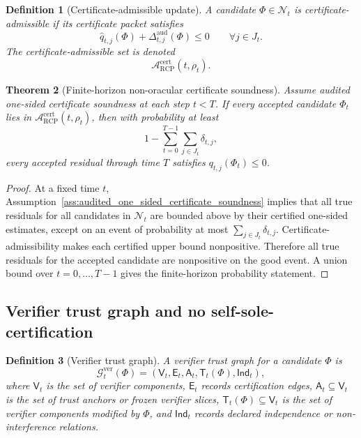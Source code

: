 \documentclass[11pt]{article}
\newtheorem{theorem}{Theorem}[section]
\newtheorem{definition}[theorem]{Definition}
\newcommand{\Acal}{\mathcal{A}}
\newcommand{\Gcal}{\mathcal{G}}
\newcommand{\1}{\mathbf{1}}
\newcommand{\RCP}{\mathrm{RCP}}
\providecommand{\Ncal}{\mathcal{N}}
\providecommand{\ver}{\mathrm{ver}}
\begin{document}
\begin{definition}[Certificate-admissible update]
\label{def:certificate_admissible_update}
A candidate \(\Phi\in\Ncal_t\) is certificate-admissible if its certificate packet satisfies
\[
\widehat q_{t,j}(\Phi)+\Delta_{t,j}^{\mathrm{aud}}(\Phi)
\le0
\qquad
\forall j\in J_t.
\]
The certificate-admissible set is denoted
\[
\Acal_{\RCP}^{\mathrm{cert}}(t,\rho_t).
\]
\end{definition}

\begin{theorem}[Finite-horizon non-oracular certificate soundness]
\label{thm:finite_horizon_non_oracular_certificate_soundness}
Assume audited one-sided certificate soundness at each step \(t<T\).  If every accepted candidate \(\Phi_t\) lies in \(\Acal_{\RCP}^{\mathrm{cert}}(t,\rho_t)\), then with probability at least
\[
1-
\sum_{t=0}^{T-1}\sum_{j\in J_t}\delta_{t,j},
\]
every accepted residual through time \(T\) satisfies \(q_{t,j}(\Phi_t)\le0\).
\end{theorem}

\begin{proof}
At a fixed time \(t\), Assumption~\ref{ass:audited_one_sided_certificate_soundness} implies that all true residuals for all candidates in \(\Ncal_t\) are bounded above by their certified one-sided estimates, except on an event of probability at most \(\sum_{j\in J_t}\delta_{t,j}\).  Certificate-admissibility makes each certified upper bound nonpositive.  Therefore all true residuals for the accepted candidate are nonpositive on the good event.  A union bound over \(t=0,\ldots,T-1\) gives the finite-horizon probability statement.
\end{proof}

\subsection{Verifier trust graph and no self-sole-certification}

\begin{definition}[Verifier trust graph]
\label{def:verifier_trust_graph_operational}
A verifier trust graph for a candidate \(\Phi\) is
\[
\Gcal_t^{\ver}(\Phi)
=(\mathsf V_t,\mathsf E_t,\mathsf A_t,\mathsf T_t(\Phi),\mathsf{Ind}_t),
\]
where \(\mathsf V_t\) is the set of verifier components, \(\mathsf E_t\) records certification edges, \(\mathsf A_t\subseteq\mathsf V_t\) is the set of trust anchors or frozen verifier slices, \(\mathsf T_t(\Phi)\subseteq\mathsf V_t\) is the set of verifier components modified by \(\Phi\), and \(\mathsf{Ind}_t\) records declared independence or non-interference relations.
\end{definition}
\end{document}
